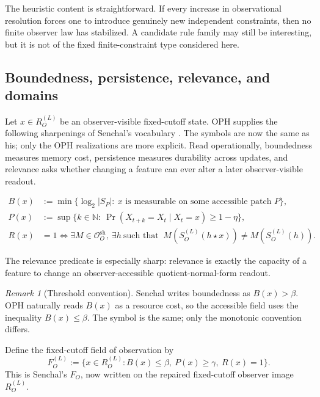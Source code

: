 \documentclass[11pt]{article}
\theoremstyle{remark}
\newtheorem{remark}[theorem]{Remark}
\theoremstyle{plain}
\begin{document}
The heuristic content is straightforward. If every increase in observational resolution forces one to introduce genuinely new independent constraints, then no finite observer law has stabilized. A candidate rule family may still be interesting, but it is not of the fixed finite-constraint type considered here.

\subsection{Boundedness, persistence, relevance, and domains}

Let \(x\in R_O^{(L)}\) be an observer-visible fixed-cutoff state. OPH supplies the following sharpenings of Senchal's vocabulary \cite{senchal2025}. The symbols are now the same as his; only the OPH realizations are more explicit. Read operationally, boundedness measures memory cost, persistence measures durability across updates, and relevance asks whether changing a feature can ever alter a later observer-visible readout.

\begin{align*}
B(x)&:=\min\{\log_2|S_P|:\ x\text{ is measurable on some accessible patch }P\},\\
P(x)&:=\sup\{k\in\mathbb N:\ \Pr(X_{t+k}=X_t\mid X_t=x)\ge 1-\eta\},\\
R(x)&=1
\iff
\exists M\in \mathcal O_O^{\mathrm{sh}},\ \exists h\
\text{such that }\
M(S_O^{(L)}(h\star x))\neq M(S_O^{(L)}(h)).
\end{align*}

The relevance predicate is especially sharp: relevance is exactly the capacity of a feature to change an observer-accessible quotient-normal-form readout.

\begin{remark}[Threshold convention]
Senchal writes boundedness as \(B(x)>\beta\). OPH naturally reads \(B(x)\) as a resource cost, so the accessible field uses the inequality \(B(x)\le \beta\). The symbol is the same; only the monotonic convention differs.
\end{remark}

Define the fixed-cutoff field of observation by
\[
F_O^{(L)}:=\{x\in R_O^{(L)}: B(x)\le \beta,\ P(x)\ge \gamma,\ R(x)=1\}.
\]
This is Senchal's \(F_O\), now written on the repaired fixed-cutoff observer image \(R_O^{(L)}\).
\end{document}
